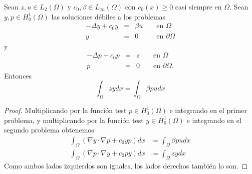 \documentclass{article}
\begin{document}
\begin{theorem}
Sean $z,u\in L_2(\Omega)$ y $c_0, \beta \in L_{\infty}(\Omega)$ con $c_0(x)\geq 0$ casi siempre en $\Omega$. Sean $y,p\in H_{0}^{1}(\Omega)$ las soluciones débiles a los problemas 
\begin{equation}\begin{aligned}
-\Delta y+c_{0} y &=& \beta u & & \text{ en } \Omega \\
y &=& 0 & & \text{ en } \partial\Omega
\end{aligned}\end{equation}
y 
\begin{equation}\begin{aligned}
-\Delta p+c_{0} p &=& z & & \text { en } \Omega \\
p &=& 0 & & \text { en } \partial \Omega .
\end{aligned}\end{equation}
Entonces 
\begin{equation}\int_{\Omega} z y d x=\int_{\Omega} \beta p u d x\end{equation}
\end{theorem}
\begin{proof}
Multiplicando por la función test $p\in H_{0}^{1}(\Omega)$ e integrando en el primer problema, y multiplicando por la función test $y\in H_{0}^{1}(\Omega)$ e integrando en el segundo problema obtenemos
\begin{equation*}
\begin{split}
    \int_{\Omega}\left(\nabla y \cdot \nabla p+c_{0} y p\right) d x&=\int_{\Omega} \beta p u d x\\
    \int_{\Omega}\left(\nabla p \cdot \nabla y+c_{0} p y\right) d x&=\int_{\Omega} z y d x
\end{split}\end{equation*}
Como ambos lados izquierdos son iguales, los lados derechos también lo son.
\end{proof}
\end{document}
